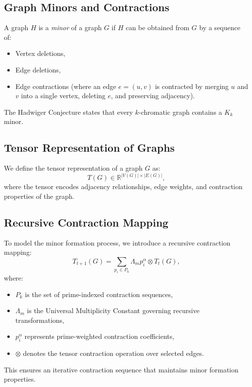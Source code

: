 \documentclass{article}
\theoremstyle{plain}
\begin{document}
\subsection{Graph Minors and Contractions}
A graph $H$ is a \textit{minor} of a graph $G$ if $H$ can be obtained from $G$ by a sequence of:
\begin{itemize}
    \item Vertex deletions,
    \item Edge deletions,
    \item Edge contractions (where an edge $e = (u, v)$ is contracted by merging $u$ and $v$ into a single vertex, deleting $e$, and preserving adjacency).
\end{itemize}
The Hadwiger Conjecture states that every $k$-chromatic graph contains a $K_k$ minor.

\subsection{Tensor Representation of Graphs}
We define the tensor representation of a graph $G$ as:
\begin{equation}
    T(G) \in \mathbb{R}^{|V(G)| \times |E(G)|},
\end{equation}
where the tensor encodes adjacency relationships, edge weights, and contraction properties of the graph.

\subsection{Recursive Contraction Mapping}
To model the minor formation process, we introduce a recursive contraction mapping:
\begin{equation}
    T_{t+1}(G) = \sum_{p_i \in P_k} \Lambda_m p_i^\alpha \otimes T_t(G),
\end{equation}
where:
\begin{itemize}
    \item $P_k$ is the set of prime-indexed contraction sequences,
    \item $\Lambda_m$ is the Universal Multiplicity Constant governing recursive transformations,
    \item $p_i^\alpha$ represents prime-weighted contraction coefficients,
    \item $\otimes$ denotes the tensor contraction operation over selected edges.
\end{itemize}
This ensures an iterative contraction sequence that maintains minor formation properties.
\end{document}
